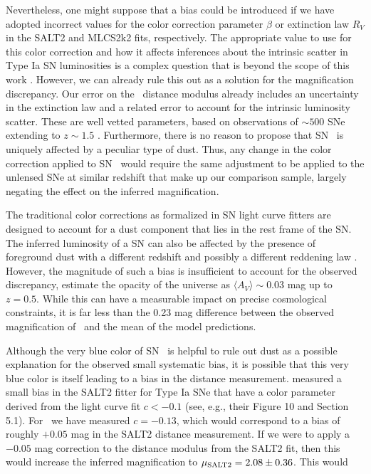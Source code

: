 Nevertheless, one might suppose that a bias could be introduced if we
have adopted incorrect values for the color correction parameter
$\beta$ or extinction law $R_V$ in the SALT2 and MLCS2k2 fits,
respectively.  The appropriate value to use for this color correction
and how it affects inferences about the intrinsic scatter in Type Ia
SN luminosities is a complex question that is beyond the scope of this
work \citep[see
e.g.][]{Marriner:2011,Chotard:2011,Kessler:2013,Scolnic:2014a}.
However, we can already rule this out as a solution for the
magnification discrepancy.  Our error on the \tomas\ distance modulus
already includes an uncertainty in the extinction law and a related
error to account for the intrinsic luminosity scatter. These are well
vetted parameters, based on observations of $\sim500$ SNe extending
to $z\sim1.5$ \citep{Sullivan:2011}.  Furthermore, there is no reason
to propose that SN \tomas\ is uniquely affected by a peculiar type of
dust.  Thus, any change in the color correction applied to SN \tomas\
would require the same adjustment to be applied to the unlensed SNe at
similar redshift that make up our comparison sample, largely negating
the effect on the inferred magnification. 

The traditional color corrections as formalized in SN light curve
fitters are designed to account for a dust component that lies in the
rest frame of the SN.  The inferred luminosity of a SN can also be
affected by the presence of foreground dust with a different redshift
and possibly a different reddening law \citep{Menard:2010b}.  However,
the magnitude of such a bias is insufficient to account for the
observed discrepancy, \citet{Menard:2010a} estimate the opacity of the
universe as $\langle A_{V}\rangle\sim0.03$ mag up to $z=0.5$.  While
this can have a measurable impact on precise cosmological constraints,
it is far less than the 0.23 mag difference between the observed
magnification of \tomas\ and the mean of the model predictions.  


Although the very blue color of SN \tomas\ is helpful to rule out dust
as a possible explanation for the observed small systematic bias, it
is possible that this very blue color is itself leading to a bias in
the distance measurement.  \citet{Scolnic:2014b} measured a small bias
in the SALT2 fitter for Type Ia SNe that have a color parameter
derived from the light curve fit $c<-0.1$ (see, e.g., their Figure 10
and Section 5.1). For \tomas\ we have measured $c=-0.13$, which would
correspond to a bias of roughly $+0.05$ mag in the SALT2 distance
measurement.  If we were to apply a $-0.05$ mag correction to the
distance modulus from the SALT2 fit, then this would increase the
inferred magnification to $\mu_{\rm SALT2}=2.08\pm0.36$.  This would

